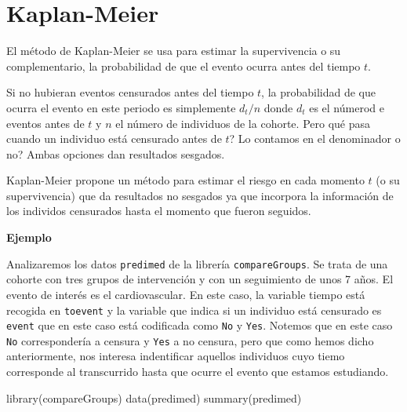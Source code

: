 \documentclass[
]{book}
\newenvironment{Shaded}{\begin{snugshade}}{\end{snugshade}}
\newcommand{\FunctionTok}[1]{\textcolor[rgb]{0.00,0.00,0.00}{#1}}
\newcommand{\NormalTok}[1]{#1}
\begin{document}
\hypertarget{kaplan-meier}{%
\section{Kaplan-Meier}\label{kaplan-meier}}

El método de Kaplan-Meier se usa para estimar la supervivencia o su complementario, la probabilidad de que el evento ocurra antes del tiempo \(t\).

Si no hubieran eventos censurados antes del tiempo \(t\), la probabilidad de que ocurra el evento en este periodo es simplemente \(d_t/n\) donde \(d_t\) es el númerod e eventos antes de \(t\) y \(n\) el número de individuos de la cohorte. Pero qué pasa cuando un individuo está censurado antes de \(t\)? Lo contamos en el denominador o no? Ambas opciones dan resultados sesgados.

Kaplan-Meier propone un método para estimar el riesgo en cada momento \(t\) (o su supervivencia) que da resultados no sesgados ya que incorpora la información de los individos censurados hasta el momento que fueron seguidos.

\textbf{Ejemplo}

Analizaremos los datos \texttt{predimed} de la librería \texttt{compareGroups}. Se trata de una cohorte con tres grupos de intervención y con un seguimiento de unos 7 años. El evento de interés es el cardiovascular. En este caso, la variable tiempo está recogida en \texttt{toevent} y la variable que indica si un individuo está censurado es \texttt{event} que en este caso está codificada como \texttt{No} y \texttt{Yes}. Notemos que en este caso \texttt{No} correspondería a censura y \texttt{Yes} a no censura, pero que como hemos dicho anteriormente, nos interesa indentificar aquellos individuos cuyo tiemo corresponde al transcurrido hasta que ocurre el evento que estamos estudiando.

\begin{Shaded}
\begin{Highlighting}[]
\FunctionTok{library}\NormalTok{(compareGroups)}
\FunctionTok{data}\NormalTok{(predimed)}
\FunctionTok{summary}\NormalTok{(predimed)}
\end{Highlighting}
\end{Shaded}
\end{document}
